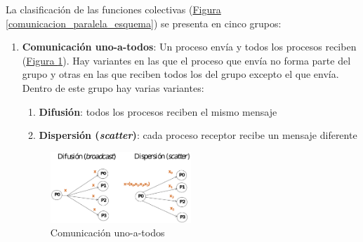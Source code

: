 \documentclass[10pt,a4paper,spanish]{report}
\begin{document}
La clasificación de las funciones colectivas (\hyperref[comunicacion_paralela_esquema]{Figura \ref*{comunicacion_paralela_esquema}}) se presenta en cinco grupos:
\begin{enumerate}[\color{azul}{\bf $\heartsuit$}]
    \item \textcolor[rgb]{0.2,0.4,0.8}{\textbf{Comunicación uno-a-todos}}: \label{uno_a_todos} Un proceso envía y todos los procesos reciben (\hyperref[comunicacion_uno_a_todos]{Figura \ref*{comunicacion_uno_a_todos}}). Hay variantes en las que el proceso que envía no forma parte del grupo y otras en las que reciben todos los del grupo excepto el que envía. Dentro de este grupo hay varias variantes:
    \begin{enumerate}[$\longrightarrow$]
        \item \textbf{\textcolor[rgb]{0.2,0.4,0.8}{Difusión}}: todos los procesos reciben el mismo mensaje
        \item \textbf{\textcolor[rgb]{0.2,0.4,0.8}{Dispersión (\textit{scatter})}}: cada proceso receptor recibe un mensaje diferente
    \end{enumerate}
    \begin{figure}[!h]
        \centering
        \includegraphics[width=0.5\textwidth]{29}
        \caption{Comunicación uno-a-todos}
        \label{comunicacion_uno_a_todos}
    \end{figure}


\end{enumerate}
\end{document}
